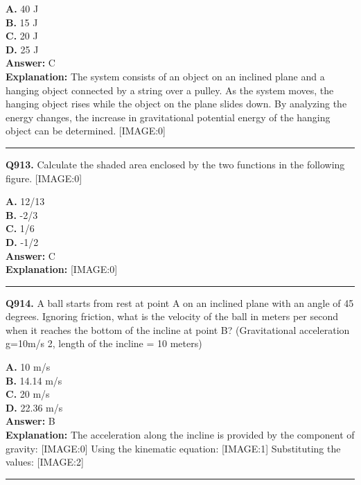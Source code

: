 \documentclass[12pt]{article}
\begin{document}
\textbf{A.} 40 J \\
\textbf{B.} 15 J \\
\textbf{C.} 20 J \\
\textbf{D.} 25 J \\

\textbf{Answer:} C \\
\textbf{Explanation:} The system consists of an object on an inclined plane and a hanging object connected by a string over a pulley. As the system moves, the hanging object rises while the object on the plane slides down. By analyzing the energy changes, the increase in gravitational potential energy of the hanging object can be determined.
[IMAGE:0]

\hrule
\vspace{1em}


\noindent
\textbf{Q913.} Calculate the shaded area enclosed by the two functions in the following figure.
[IMAGE:0]



\textbf{A.} 12/13 \\
\textbf{B.} -2/3 \\
\textbf{C.} 1/6 \\
\textbf{D.} -1/2 \\

\textbf{Answer:} C \\
\textbf{Explanation:} [IMAGE:0]

\hrule
\vspace{1em}


\noindent
\textbf{Q914.} A ball starts from rest at point A on an inclined plane with an angle of 45 degrees. Ignoring friction, what is the velocity of the ball in meters per second when it reaches the bottom of the incline at point B? (Gravitational acceleration g=10m/s
2, length of the incline = 10 meters)



\textbf{A.} 10 m/s \\
\textbf{B.} 14.14 m/s \\
\textbf{C.} 20 m/s \\
\textbf{D.} 22.36 m/s \\

\textbf{Answer:} B \\
\textbf{Explanation:} The acceleration along the incline is provided by the component of gravity:
[IMAGE:0]
Using the kinematic equation:
[IMAGE:1]
Substituting the values:
[IMAGE:2]

\hrule
\vspace{1em}
\end{document}
